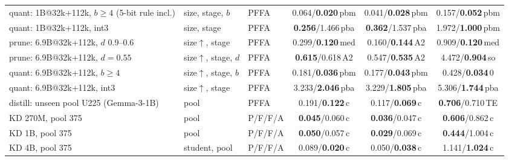 \begin{table}[!t]
\begin{tabular}{@{}>{\raggedright\arraybackslash}p{4.15cm}>{\raggedright\arraybackslash}p{1.4cm}lccc@{}}
\addlinespace[1.5pt]
quant: 1B@32k+112k, $b\ge4$ (5-bit rule incl.) & size, stage, $b$ & PFFA & 0.064/\textbf{0.020}{\scriptsize\,pbm} & 0.041/\textbf{0.028}{\scriptsize\,pbm} & 0.157/\textbf{0.052}{\scriptsize\,pbm} \\
quant: 1B@32k+112k, int3 & size, stage & PFFA & \textbf{0.256}/1.466{\scriptsize\,pba} & \textbf{0.362}/1.537{\scriptsize\,pba} & 1.972/\textbf{1.000}{\scriptsize\,pbm} \\
\addlinespace[1.5pt]
prune: 6.9B@32k+112k, $d$ 0.9--0.6 & size$\uparrow$, stage & PFFA & 0.299/\textbf{0.120}{\scriptsize\,med} & 0.160/\textbf{0.144}{\scriptsize\,A2} & 0.909/\textbf{0.120}{\scriptsize\,med} \\
prune: 6.9B@32k+112k, $d=0.55$ & size$\uparrow$, stage, $d$ & PFFA & \textbf{0.615}/0.618{\scriptsize\,A2} & 0.547/\textbf{0.535}{\scriptsize\,A2} & 4.472/\textbf{0.904}{\scriptsize\,so} \\
\addlinespace[1.5pt]
quant: 6.9B@32k+112k, $b\ge4$ & size$\uparrow$, stage, $b$ & PFFA & 0.181/\textbf{0.036}{\scriptsize\,pbm} & 0.177/\textbf{0.043}{\scriptsize\,pbm} & 0.428/\textbf{0.034}{\scriptsize\,0} \\
quant: 6.9B@32k+112k, int3 & size$\uparrow$, stage & PFFA & 3.233/\textbf{2.046}{\scriptsize\,pba} & 3.229/\textbf{1.805}{\scriptsize\,pba} & 5.306/\textbf{1.744}{\scriptsize\,pba} \\
\addlinespace[1.5pt]
distill: unseen pool U225 (Gemma-3-1B) & pool & PFFA & 0.191/\textbf{0.122}{\scriptsize\,c} & 0.117/\textbf{0.069}{\scriptsize\,c} & \textbf{0.706}/0.710{\scriptsize\,TE} \\
\addlinespace[1.5pt]
KD 270M, pool 375 & pool & P/F/F/A & \textbf{0.045}/0.060{\scriptsize\,c} & \textbf{0.036}/0.047{\scriptsize\,c} & \textbf{0.606}/0.862{\scriptsize\,c} \\
KD 1B, pool 375 & pool & P/F/F/A & \textbf{0.050}/0.057{\scriptsize\,c} & \textbf{0.029}/0.069{\scriptsize\,c} & \textbf{0.444}/1.004{\scriptsize\,c} \\
KD 4B, pool 375 & student, pool & P/F/F/A & 0.089/\textbf{0.020}{\scriptsize\,c} & 0.050/\textbf{0.038}{\scriptsize\,c} & 1.141/\textbf{1.024}{\scriptsize\,c} \\
\bottomrule\end{tabular}
\end{table}
